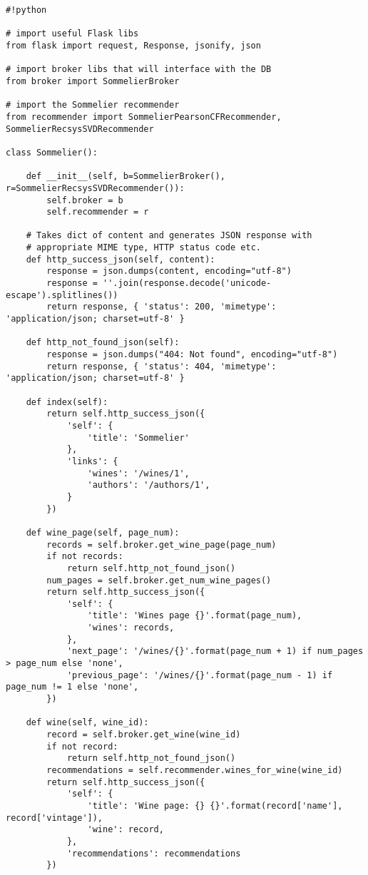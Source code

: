 \begin{verbatim}
#!python

# import useful Flask libs
from flask import request, Response, jsonify, json

# import broker libs that will interface with the DB
from broker import SommelierBroker

# import the Sommelier recommender
from recommender import SommelierPearsonCFRecommender, SommelierRecsysSVDRecommender

class Sommelier():

    def __init__(self, b=SommelierBroker(), r=SommelierRecsysSVDRecommender()):
        self.broker = b
        self.recommender = r

    # Takes dict of content and generates JSON response with
    # appropriate MIME type, HTTP status code etc.
    def http_success_json(self, content):
        response = json.dumps(content, encoding="utf-8")
        response = ''.join(response.decode('unicode-escape').splitlines())
        return response, { 'status': 200, 'mimetype': 'application/json; charset=utf-8' }

    def http_not_found_json(self):
        response = json.dumps("404: Not found", encoding="utf-8")
        return response, { 'status': 404, 'mimetype': 'application/json; charset=utf-8' }

    def index(self):
        return self.http_success_json({
            'self': {
                'title': 'Sommelier'
            },
            'links': {
                'wines': '/wines/1',
                'authors': '/authors/1',
            }
        })

    def wine_page(self, page_num):
        records = self.broker.get_wine_page(page_num)
        if not records:
            return self.http_not_found_json()
        num_pages = self.broker.get_num_wine_pages()
        return self.http_success_json({
            'self': {
                'title': 'Wines page {}'.format(page_num),
                'wines': records,
            },
            'next_page': '/wines/{}'.format(page_num + 1) if num_pages > page_num else 'none',
            'previous_page': '/wines/{}'.format(page_num - 1) if page_num != 1 else 'none',
        })

    def wine(self, wine_id):
        record = self.broker.get_wine(wine_id)
        if not record:
            return self.http_not_found_json()
        recommendations = self.recommender.wines_for_wine(wine_id)
        return self.http_success_json({
            'self': {
                'title': 'Wine page: {} {}'.format(record['name'], record['vintage']),
                'wine': record,
            },
            'recommendations': recommendations
        })
    

\end{verbatim}
